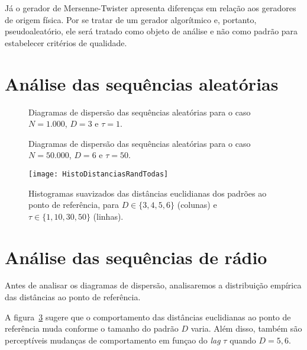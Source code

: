Já o gerador de Mersenne-Twister apresenta diferenças em relação aos geradores de origem física.
Por se tratar de um gerador algorítmico e, portanto, pseudoaleatório, ele será tratado como objeto de análise e não como padrão para estabelecer critérios de qualidade.

\section{Análise das sequências aleatórias}

\begin{figure}
\centering
{}
\caption{Diagramas de dispersão das sequências aleatórias para o caso $N=1.000$, $D=3$ e $\tau=1$.}\label{Fig:AleattD3tau1}
\end{figure}

\begin{figure}
\centering
{}
\caption{Diagramas de dispersão das sequências aleatórias para o caso $N=50.000$, $D=6$ e $\tau=50$.}\label{Fig:QuantD3tau10log}
\end{figure}

\begin{figure}[hbt]
	\centering
	\texttt{[image: HistoDistanciasRandTodas]}
	\caption{Histogramas suavizados das distâncias euclidianas dos padrões ao ponto de referência, para $D\in\{3,4,5,6\}$ (colunas) e $\tau\in\{1,10,30,50\}$ (linhas).}\label{Fig:HistoDistanciasRandTodas}
\end{figure}



\section{Análise das sequências de rádio}


Antes de analisar os diagramas de dispersão, analisaremos a distribuição empírica das distâncias ao ponto de referência.

A figura~\ref{Fig:HistoDistanciasRandTodas} sugere que o comportamento das distâncias euclidianas ao ponto de referência muda conforme o tamanho do padrão $D$ varia.
Além disso, também são perceptíveis mudanças de comportamento em funçao do \textit{lag} $\tau$ quando $D=5,6$.

